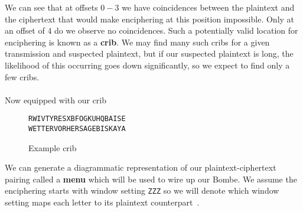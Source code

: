 We can see that at offsets $0-3$ we have coincidences between the
plaintext and the ciphertext that would make enciphering at this
position impossible. Only at an offset of $4$ do we observe no
coincidences. Such a potentially valid location for enciphering is
known as a {\bf{crib}}. We may find many such cribs for a given
transmission and suspected plaintext, but if our suspected plaintext
is long, the likelihood of this occurring goes down significantly, so
we expect to find only a few cribs.
\\\\Now equipped with our crib
\begin{figure}[H]
  \begin{center}
    \texttt{RWIVTYRESXBFOGKUHQBAISE}  \\
    \texttt{WETTERVORHERSAGEBISKAYA} \\
  \end{center}
  \caption{Example crib}
  \label{fig:crib}
\end{figure}
\noindent We can generate a diagrammatic representation of our
plaintext-ciphertext pairing called a {\bf{menu}} which will be used
to wire up our Bombe. We assume the enciphering starts with window
setting \texttt{ZZZ} so we will denote which window setting maps
each letter to its plaintext counterpart~\cite[p.~306]{Welchman1982HutSix}.
